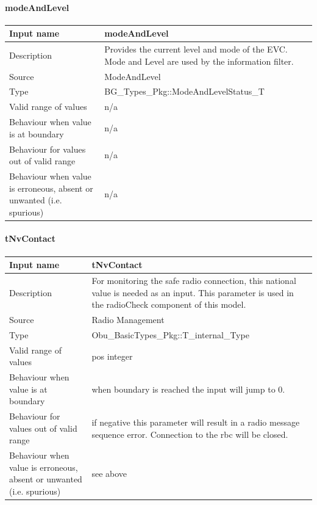 \paragraph{modeAndLevel}

\begin{longtable}{p{}p{}}
\toprule
Input name				& modeAndLevel \\
\midrule
Description				& Provides the current level and mode of the EVC. Mode and Level are used by the information filter.\\
\midrule
Source					& ModeAndLevel \\ 
\midrule
Type					& BG\_Types\_Pkg::ModeAndLevelStatus\_T \\
\midrule
Valid range of values	& n/a\\
\midrule
Behaviour when value is at boundary	& n/a\\
\midrule
Behaviour for values out of valid range	& n/a\\
\midrule
Behaviour when value is erroneous, absent or unwanted (i.e. spurious) & n/a\\
\bottomrule
\end{longtable}


\paragraph{tNvContact}

\begin{longtable}{p{}p{}}
\toprule
Input name				& tNvContact \\
\midrule
Description				& For monitoring the safe radio connection, this national value is needed as an input. This parameter is used in the radioCheck component of this model. \\
\midrule
Source					& Radio Management\\ 
\midrule
Type					& Obu\_BasicTypes\_Pkg::T\_internal\_Type \\
\midrule
Valid range of values	& pos integer \\
\midrule
Behaviour when value is at boundary	& when boundary is reached the input will jump to 0.\\
\midrule
Behaviour for values out of valid range	& if negative this parameter will result in a radio message sequence error. Connection to the rbc will be closed.\\
\midrule
Behaviour when value is erroneous, absent or unwanted (i.e. spurious) & see above \\
\bottomrule
\end{longtable}

